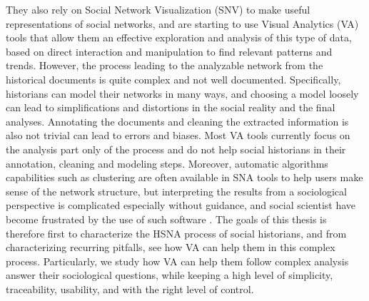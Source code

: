 They also rely on Social Network Visualization (SNV) to make useful representations of social networks, and are starting to use Visual Analytics (VA) tools that allow them an effective exploration and analysis of this type of data, based on direct interaction and manipulation to find relevant patterns and trends.
However, the process leading to the analyzable network from the historical documents is quite complex and not well documented.
Specifically, historians can model their networks in many ways, and choosing a model loosely can lead to simplifications and distortions in the social reality and the final analyses.
Annotating the documents and cleaning the extracted information is also not trivial can lead to errors and biases.
Most VA tools currently focus on the analysis part only of the process and do not help social historians in their annotation, cleaning and modeling steps.
Moreover, automatic algorithms capabilities such as clustering are often available in SNA tools to help users make sense of the network structure, but interpreting the results from a sociological perspective is complicated especially without guidance, and social scientist have become frustrated by the use of such software \cite{lemercierBackSourcesPracticing2021}.
The goals of this thesis is therefore first to characterize the HSNA process of social historians, and from characterizing recurring pitfalls, see how VA can help them in this complex process.
Particularly, we study how VA can help them follow complex analysis answer their sociological questions, while keeping a high level of simplicity, traceability, usability, and with the right level of control.

%

